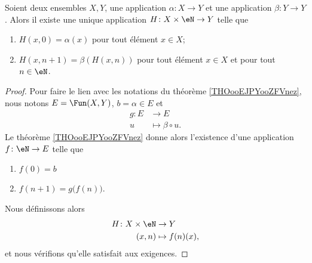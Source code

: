 \begin{corollary}       \label{CORooVNHKooRkKtXf}
	Soient deux ensembles \( X,Y\), une application \( \alpha\colon X\to Y\) et une application \( \beta\colon Y\to Y\). Alors il existe une unique application \( H\colon X\times \eN\to Y\) telle que
	\begin{enumerate}
		\item
		      \( H(x , 0)   = \alpha(x)\)   pour tout élément \( x\in X\);
		\item
		      \( H(x , n+1) = \beta( H( x , n) )\) pour tout élément \( x\in X\) et pour tout \( n\in \eN\).
	\end{enumerate}
\end{corollary}

\begin{proof}
	Pour faire le lien avec les notations du théorème \ref{THOooEJPYooZFVnez}, nous notons \( E=\Fun(X,Y)\), \( b=\alpha\in E\) et
	\begin{equation}
		\begin{aligned}
			g\colon E & \to E                 \\
			u         & \mapsto \beta\circ u.
		\end{aligned}
	\end{equation}
	Le théorème \ref{THOooEJPYooZFVnez} donne alors l'existence d'une application \( f\colon \eN\to E\) telle que
	\begin{enumerate}
		\item
		      \( f(0)=b\)
		\item
		      \( f(n+1)=g\big( f(n) \big)\).
	\end{enumerate}
	Nous définissons alors
	\begin{equation}
		\begin{aligned}
			H\colon X\times \eN & \to Y          \\
			(x,n)               & \mapsto f(n) (x),
		\end{aligned}
	\end{equation}
	et nous vérifions qu'elle satisfait aux exigences.


\end{proof}

